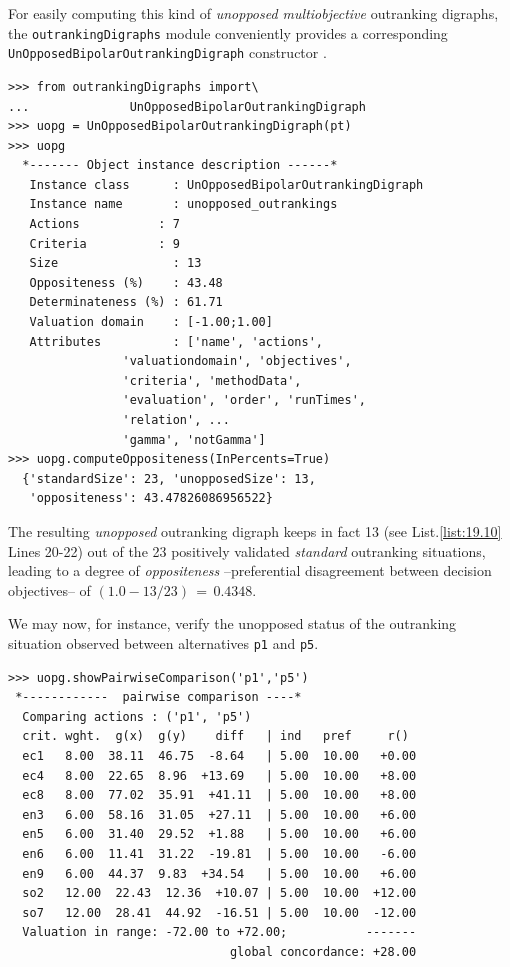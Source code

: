For easily computing this kind of \emph{unopposed multiobjective} outranking digraphs, the \texttt{outrankingDigraphs} module conveniently provides a corresponding\\ \texttt{UnOpposedBipolarOutrankingDigraph} constructor .
\begin{lstlisting}[caption={Computing unopposed outranking digraphs},label=list:19.10]
>>> from outrankingDigraphs import\
...              UnOpposedBipolarOutrankingDigraph
>>> uopg = UnOpposedBipolarOutrankingDigraph(pt)
>>> uopg
  *------- Object instance description ------*
   Instance class      : UnOpposedBipolarOutrankingDigraph
   Instance name       : unopposed_outrankings
   Actions           : 7
   Criteria          : 9
   Size                : 13
   Oppositeness (%)    : 43.48
   Determinateness (%) : 61.71
   Valuation domain    : [-1.00;1.00]
   Attributes          : ['name', 'actions',
                'valuationdomain', 'objectives',
                'criteria', 'methodData',
                'evaluation', 'order', 'runTimes',
                'relation', ...
                'gamma', 'notGamma']
>>> uopg.computeOppositeness(InPercents=True)
  {'standardSize': 23, 'unopposedSize': 13,
   'oppositeness': 43.47826086956522}			   
\end{lstlisting}

The resulting \emph{unopposed} outranking digraph keeps in fact 13 (see List.\vref{list:19.10} Lines 20-22) out of the 23 positively validated \emph{standard} outranking situations, leading to a degree of \emph{oppositeness} --preferential disagreement between decision objectives-- of $(1.0 - 13/23)\,=\,0.4348$.

We may now, for instance, verify the unopposed status of the outranking situation observed between alternatives \texttt{p1} and \texttt{p5}.
\begin{lstlisting}[caption={Example of unopposed multiobjective outranking situation},label=list:19.11]
>>> uopg.showPairwiseComparison('p1','p5')
 *------------  pairwise comparison ----*
  Comparing actions : ('p1', 'p5')
  crit. wght.  g(x)  g(y)    diff   | ind   pref     r()
  ec1   8.00  38.11  46.75  -8.64   | 5.00  10.00   +0.00
  ec4   8.00  22.65  8.96  +13.69   | 5.00  10.00   +8.00
  ec8   8.00  77.02  35.91  +41.11  | 5.00  10.00   +8.00
  en3   6.00  58.16  31.05  +27.11  | 5.00  10.00   +6.00
  en5   6.00  31.40  29.52  +1.88   | 5.00  10.00   +6.00
  en6   6.00  11.41  31.22  -19.81  | 5.00  10.00   -6.00
  en9   6.00  44.37  9.83  +34.54   | 5.00  10.00   +6.00
  so2   12.00  22.43  12.36  +10.07 | 5.00  10.00  +12.00
  so7   12.00  28.41  44.92  -16.51 | 5.00  10.00  -12.00
  Valuation in range: -72.00 to +72.00;           -------
                               global concordance: +28.00
\end{lstlisting}

